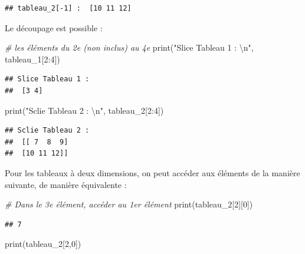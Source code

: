 \documentclass[12pt,]{book}
\newenvironment{Shaded}{\begin{snugshade}}{\end{snugshade}}
\newcommand{\DecValTok}[1]{\textcolor[rgb]{0.00,0.00,0.81}{#1}}
\newcommand{\CharTok}[1]{\textcolor[rgb]{0.31,0.60,0.02}{#1}}
\newcommand{\StringTok}[1]{\textcolor[rgb]{0.31,0.60,0.02}{#1}}
\newcommand{\CommentTok}[1]{\textcolor[rgb]{0.56,0.35,0.01}{\textit{#1}}}
\newcommand{\BuiltInTok}[1]{#1}
\newcommand{\NormalTok}[1]{#1}
\numberwithin{equation}{section}
\numberwithin{countremarque}{section}
\begin{document}
\begin{lstlisting}
## tableau_2[-1] :  [10 11 12]
\end{lstlisting}

Le découpage est possible :

\begin{Shaded}
\begin{Highlighting}[]
\CommentTok{# les éléments du 2e (non inclus) au 4e}
\BuiltInTok{print}\NormalTok{(}\StringTok{"Slice Tableau 1 : }\CharTok{\textbackslash{}n}\StringTok{"}\NormalTok{, tableau_1[}\DecValTok{2}\NormalTok{:}\DecValTok{4}\NormalTok{])}
\end{Highlighting}
\end{Shaded}

\begin{lstlisting}
## Slice Tableau 1 : 
##  [3 4]
\end{lstlisting}

\begin{Shaded}
\begin{Highlighting}[]
\BuiltInTok{print}\NormalTok{(}\StringTok{"Sclie Tableau 2 : }\CharTok{\textbackslash{}n}\StringTok{"}\NormalTok{, tableau_2[}\DecValTok{2}\NormalTok{:}\DecValTok{4}\NormalTok{])}
\end{Highlighting}
\end{Shaded}

\begin{lstlisting}
## Sclie Tableau 2 : 
##  [[ 7  8  9]
##  [10 11 12]]
\end{lstlisting}

Pour les tableaux à deux dimensions, on peut accéder aux éléments de la
manière suivante, de manière équivalente :

\begin{Shaded}
\begin{Highlighting}[]
\CommentTok{# Dans le 3e élément, accéder au 1er élément}
\BuiltInTok{print}\NormalTok{(tableau_2[}\DecValTok{2}\NormalTok{][}\DecValTok{0}\NormalTok{])}
\end{Highlighting}
\end{Shaded}

\begin{lstlisting}
## 7
\end{lstlisting}

\begin{Shaded}
\begin{Highlighting}[]
\BuiltInTok{print}\NormalTok{(tableau_2[}\DecValTok{2}\NormalTok{,}\DecValTok{0}\NormalTok{])}
\end{Highlighting}
\end{Shaded}
\end{document}

